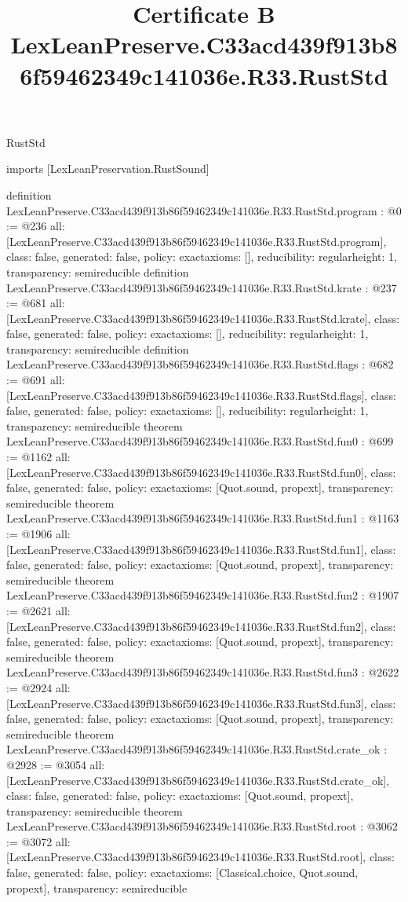 \begin{lexlean}{RustStd}
\title{Certificate B LexLeanPreserve.C33acd439f913b86f59462349c141036e.R33.RustStd}
\begin{coremodule}
imports [LexLeanPreservation.RustSound]

definition LexLeanPreserve.C33acd439f913b86f59462349c141036e.R33.RustStd.program : @0 := @236 {
  all: [LexLeanPreserve.C33acd439f913b86f59462349c141036e.R33.RustStd.program],
  class: false,
  generated: false,
  policy: exact{axioms: []},
  reducibility: regular{height: 1},
  transparency: semireducible
}
definition LexLeanPreserve.C33acd439f913b86f59462349c141036e.R33.RustStd.krate : @237 := @681 {
  all: [LexLeanPreserve.C33acd439f913b86f59462349c141036e.R33.RustStd.krate],
  class: false,
  generated: false,
  policy: exact{axioms: []},
  reducibility: regular{height: 1},
  transparency: semireducible
}
definition LexLeanPreserve.C33acd439f913b86f59462349c141036e.R33.RustStd.flags : @682 := @691 {
  all: [LexLeanPreserve.C33acd439f913b86f59462349c141036e.R33.RustStd.flags],
  class: false,
  generated: false,
  policy: exact{axioms: []},
  reducibility: regular{height: 1},
  transparency: semireducible
}
theorem LexLeanPreserve.C33acd439f913b86f59462349c141036e.R33.RustStd.fun0 : @699 := @1162 {
  all: [LexLeanPreserve.C33acd439f913b86f59462349c141036e.R33.RustStd.fun0],
  class: false,
  generated: false,
  policy: exact{axioms: [Quot.sound, propext]},
  transparency: semireducible
}
theorem LexLeanPreserve.C33acd439f913b86f59462349c141036e.R33.RustStd.fun1 : @1163 := @1906 {
  all: [LexLeanPreserve.C33acd439f913b86f59462349c141036e.R33.RustStd.fun1],
  class: false,
  generated: false,
  policy: exact{axioms: [Quot.sound, propext]},
  transparency: semireducible
}
theorem LexLeanPreserve.C33acd439f913b86f59462349c141036e.R33.RustStd.fun2 : @1907 := @2621 {
  all: [LexLeanPreserve.C33acd439f913b86f59462349c141036e.R33.RustStd.fun2],
  class: false,
  generated: false,
  policy: exact{axioms: [Quot.sound, propext]},
  transparency: semireducible
}
theorem LexLeanPreserve.C33acd439f913b86f59462349c141036e.R33.RustStd.fun3 : @2622 := @2924 {
  all: [LexLeanPreserve.C33acd439f913b86f59462349c141036e.R33.RustStd.fun3],
  class: false,
  generated: false,
  policy: exact{axioms: [Quot.sound, propext]},
  transparency: semireducible
}
theorem LexLeanPreserve.C33acd439f913b86f59462349c141036e.R33.RustStd.crate_ok : @2928 := @3054 {
  all: [LexLeanPreserve.C33acd439f913b86f59462349c141036e.R33.RustStd.crate_ok],
  class: false,
  generated: false,
  policy: exact{axioms: [Quot.sound, propext]},
  transparency: semireducible
}
theorem LexLeanPreserve.C33acd439f913b86f59462349c141036e.R33.RustStd.root : @3062 := @3072 {
  all: [LexLeanPreserve.C33acd439f913b86f59462349c141036e.R33.RustStd.root],
  class: false,
  generated: false,
  policy: exact{axioms: [Classical.choice, Quot.sound, propext]},
  transparency: semireducible
}


\end{coremodule}
\end{lexlean}
